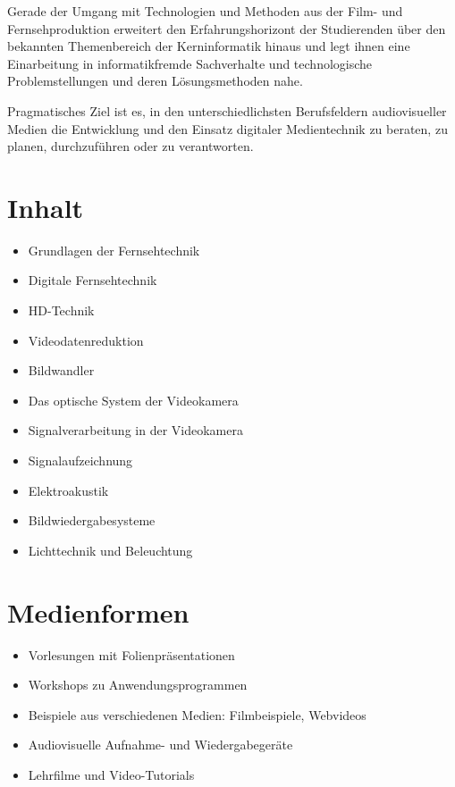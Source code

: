 Gerade der Umgang mit Technologien und Methoden aus der Film- und
Fernsehproduktion erweitert den Erfahrungshorizont der Studierenden über
den bekannten Themenbereich der Kerninformatik hinaus und legt ihnen
eine Einarbeitung in informatikfremde Sachverhalte und technologische
Problemstellungen und deren Lösungsmethoden nahe.

Pragmatisches Ziel ist es, in den unterschiedlichsten Berufsfeldern
audiovisueller Medien die Entwicklung und den Einsatz digitaler
Medientechnik zu beraten, zu planen, durchzuführen oder zu verantworten.

\hypertarget{inhaltpathlabelmi-2017modulbeschreibungen-bachelorba_vc-audiovisuelle-medientechnik}{%
\section*{Inhalt\label{/mi-2017/modulbeschreibungen-bachelor/BA_VC-audiovisuelle-medientechnik}}\label{inhaltpathlabelmi-2017modulbeschreibungen-bachelorba_vc-audiovisuelle-medientechnik}}

\begin{itemize}
\tightlist
\item
  Grundlagen der Fernsehtechnik
\item
  Digitale Fernsehtechnik
\item
  HD-Technik
\item
  Videodatenreduktion
\item
  Bildwandler
\item
  Das optische System der Videokamera
\item
  Signalverarbeitung in der Videokamera
\item
  Signalaufzeichnung
\item
  Elektroakustik
\item
  Bildwiedergabesysteme
\item
  Lichttechnik und Beleuchtung
\end{itemize}

\hypertarget{medienformenpathlabelmi-2017modulbeschreibungen-bachelorba_vc-audiovisuelle-medientechnik}{%
\section*{Medienformen\label{/mi-2017/modulbeschreibungen-bachelor/BA_VC-audiovisuelle-medientechnik}}\label{medienformenpathlabelmi-2017modulbeschreibungen-bachelorba_vc-audiovisuelle-medientechnik}}

\begin{itemize}
\tightlist
\item
  Vorlesungen mit Folienpräsentationen
\item
  Workshops zu Anwendungsprogrammen
\item
  Beispiele aus verschiedenen Medien: Filmbeispiele, Webvideos
\item
  Audiovisuelle Aufnahme- und Wiedergabegeräte
\item
  Lehrfilme und Video-Tutorials
\end{itemize}

